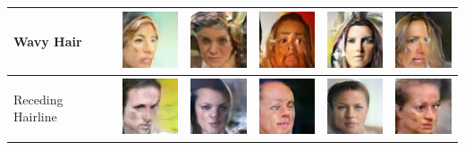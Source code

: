 \begin{table}[H]
\begin{tabular}{|llllll|}
Wavy Hair & \includegraphics[width=1.69cm, height=1.69cm]{Files/images/images17/image1.png}  &\includegraphics[width=1.69cm, height=1.69cm]{Files/images/images17/image2.png}   & \includegraphics[width=1.69cm, height=1.69cm]{Files/images/images17/image3.png}  & \includegraphics[width=1.69cm, height=1.69cm]{Files/images/images17/image52.png}  & \includegraphics[width=1.69cm, height=1.69cm]{Files/images/images17/image68.png} \\ \hline

Receding Hairline & \includegraphics[width=1.69cm, height=1.69cm]{Files/images/images14/image1.png}  &\includegraphics[width=1.69cm, height=1.69cm]{Files/images/images14/image2.png}   & \includegraphics[width=1.69cm, height=1.69cm]{Files/images/images14/image3.png}  & \includegraphics[width=1.69cm, height=1.69cm]{Files/images/images14/image52.png}  & \includegraphics[width=1.69cm, height=1.69cm]{Files/images/images14/image68.png} \\ \hline



\end{tabular}
\end{table}
